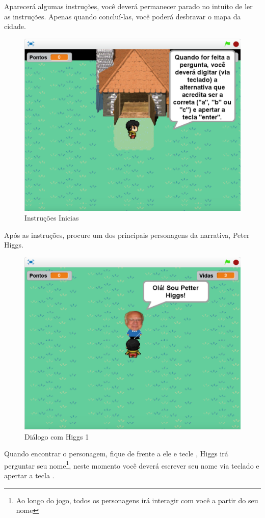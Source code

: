 \documentclass[12pt,fleqn]{book} %
\begin{document}
\newpage

Aparecerá algumas instruções, você deverá permanecer parado no intuito de ler as instruções. Apenas quando concluí-las, você poderá desbravar o mapa da cidade. 

\begin{figure}[h]
	\centering
	\includegraphics[width=0.65 \textwidth]{Produto/jogo_2}
	\caption{Instruções Inicias}
	\label{fig:app_a:jogo2}
\end{figure}

Após as instruções, procure um dos principais personagens da narrativa, Peter Higgs.

\begin{figure}[h]
	\centering
	\includegraphics[width=0.65 \textwidth]{Produto/jogo_3}
	\caption{Diálogo com Higgs 1}
	\label{fig:app_a:jogo3}
\end{figure}

\newpage

Quando encontrar o personagem, fique de frente a ele e tecle , Higgs irá perguntar seu nome\footnote{Ao longo do jogo, todos os personagens irá interagir com você a partir do seu nome}, neste momento você deverá escrever seu nome via teclado e apertar a tecla .
\end{document}
